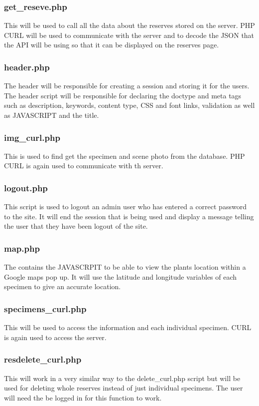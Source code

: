 	\subsubsection{get\_reseve.php}
		This will be used to call all the data about the reserves stored on the server. PHP CURL will be used to communicate with the server and to decode the JSON that the API will be using so that it can be displayed on the reserves page.

	\subsubsection{header.php}
		The header will be responsible for creating a session and storing it for the users. The header script will be responsible for declaring the doctype and meta tags such as description, keywords, content type, CSS and font links, validation as well as JAVASCRIPT and the title. 

	\subsubsection{img\_curl.php}
		This is used to find get the specimen and scene photo from the database. PHP CURL is again used to communicate with th server.

	\subsubsection{logout.php}
		This script is used to logout an admin user who has entered a correct password to the site. It will end the session that is being used and display a message telling the user that they have been logout of the site.

	\subsubsection{map.php}
		The contains the JAVASCRPIT to be able to view the plants location within a Google maps pop up. It will use the latitude and longitude variables of each specimen to give an accurate location.

	\subsubsection{specimens\_curl.php}
		This will be used to access the information and each individual specimen. CURL is again used to access the server.

	\subsubsection{resdelete\_curl.php}
		This will work in a very similar way to the delete\_curl.php script but will be used for deleting whole reserves instead of just individual specimens. The user will need the be logged in for this function to work. 

